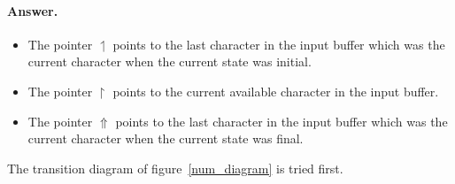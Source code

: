 \paragraph{Answer.}

\begin{itemize}

  \item The pointer \(\upharpoonleft\) points to the last character in
    the input buffer which was the current character when the current
    state was initial.

  \item The pointer \(\upharpoonright\) points to the current
    available character in the input buffer.

  \item The pointer \(\Uparrow\) points to the last character in the
    input buffer which was the current character when the current
    state was final.

\end{itemize}

The transition diagram of figure~\ref{num_diagram} is tried first.

